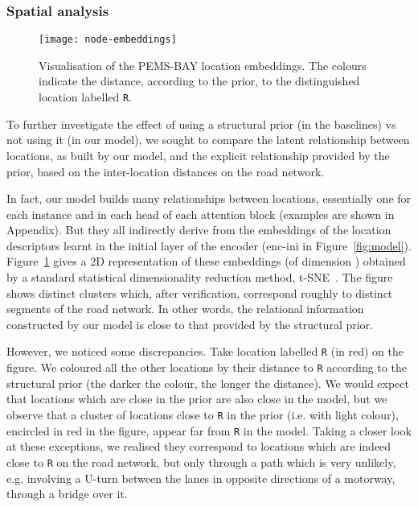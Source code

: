 \documentclass[a4paper]{article}
\begin{document}
\subsubsection{Spatial analysis}
\begin{figure}
\begin{center}
\texttt{[image: node-embeddings]}
\end{center}
\caption{\label{fig:location-embeddings}Visualisation of the PEMS-BAY location embeddings. The colours indicate the distance, according to the prior, to the distinguished location labelled {\tt R}.}
\end{figure}
To further investigate the effect of using a structural prior (in the baselines) vs not using it (in our model), we sought to compare the latent relationship between locations, as built by our model, and the explicit relationship provided by the prior, based on the inter-location distances on the road network.

In fact, our model builds many relationships between locations, essentially one for each instance and in each head of each attention block (examples are shown in Appendix). But they all indirectly derive from the embeddings of the location descriptors learnt in the initial layer of the encoder ({\sc enc-ini} in Figure~\ref{fig:model}). Figure~\ref{fig:location-embeddings} gives a 2D representation of these embeddings (of dimension ) obtained by a standard statistical dimensionality reduction method, t-SNE~\cite{maaten_visualizing_2008}. The figure shows distinct clusters which, after verification, correspond roughly to distinct segments of the road network. In other words, the relational information constructed by our model is close to that provided by the structural prior.

However, we noticed some discrepancies. Take location labelled {\tt R} (in red) on the figure. We coloured all the other locations by their distance to {\tt R} according to the structural prior (the darker the colour, the longer the distance). We would expect that locations which are close in the prior are also close in the model, but we observe that a cluster of locations close to {\tt R} in the prior (i.e. with light colour), encircled in red in the figure, appear far from {\tt R} in the model. Taking a closer look at these exceptions, we realised they correspond to locations which are indeed close to {\tt R} on the road network, but only through a path which is very unlikely, e.g. involving a U-turn between the lanes in opposite directions of a motorway, through a bridge over it.
\end{document}
